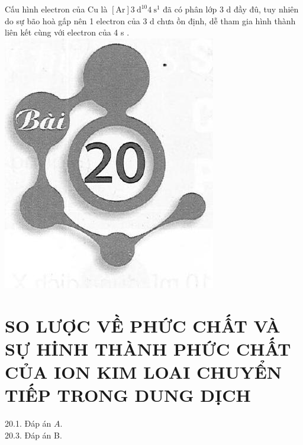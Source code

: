 \documentclass[10pt]{article}
\begin{document}
Cấu hình electron của Cu là $[\mathrm{Ar}] 3 \mathrm{~d}^{10} 4 \mathrm{~s}^{1}$ đã có phân lớp 3 d đầy đû, tuy nhiên do sự bão hoà gấp nên 1 electron của 3 d chưa ồn định, dễ tham gia hình thành liên kết cùng với electron của 4 s .\\
\includegraphics[max width=\textwidth, center]{2025_10_23_b4e16b74380d0f7e7700g-117}

\section*{SO LƯỢC VỀ PHỨC CHẤT VÀ SỰ HİNH THÀNH PHỨC CHẤT CỦA ION KIM LOAI CHUYỂN TIẾP TRONG DUNG DỊCH}
20.1. Đáp án $A$.\\
20.3. Đáp án B.
\end{document}

